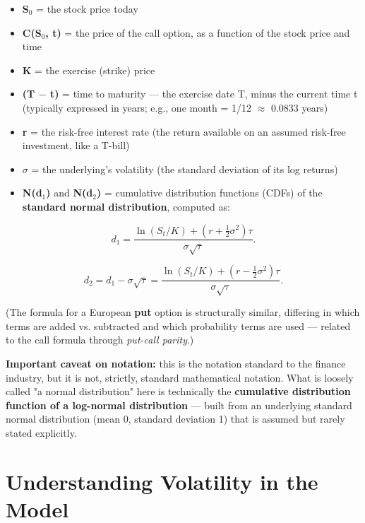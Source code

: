 \documentclass[12pt,openany]{book}
\theoremstyle{definition}
\theoremstyle{remark}
\begin{document}
\begin{itemize}
\item \textbf{S\(_0\)} = the stock price today


\item \textbf{C(S\(_0\), t)} = the price of the call option, as a function of the stock price and time


\item \textbf{K} = the exercise (strike) price


\item \textbf{(T \(-\) t)} = time to maturity --- the exercise date T, minus the current time t (typically expressed in years; e.g., one month = 1/12 \(\approx\) 0.0833 years)


\item \textbf{r} = the risk-free interest rate (the return available on an assumed risk-free investment, like a T-bill)


\item \textbf{\(\sigma\)} = the underlying's volatility (the standard deviation of its log returns)


\item \textbf{N(d\(_1\))} and \textbf{N(d\(_2\))} = cumulative distribution functions (CDFs) of the \textbf{standard normal distribution}, computed as:


\end{itemize}

\[d_1=\frac{\ln(S_t/K)+(r+\tfrac12\sigma^2)\tau}{\sigma\sqrt{\tau}}.\]

\[d_2=d_1-\sigma\sqrt{\tau}=\frac{\ln(S_t/K)+(r-\tfrac12\sigma^2)\tau}{\sigma\sqrt{\tau}}.\]

(The formula for a European \textbf{put} option is structurally similar, differing in which terms are added vs. subtracted and which probability terms are used --- related to the call formula through \emph{put-call parity}.)

\textbf{Important caveat on notation:} this is the notation standard to the finance industry, but it is not, strictly, standard mathematical notation. What is loosely called "a normal distribution" here is technically the \textbf{cumulative distribution function of a log-normal distribution} --- built from an underlying standard normal distribution (mean 0, standard deviation 1) that is assumed but rarely stated explicitly.

\section{Understanding Volatility in the Model}
\end{document}
